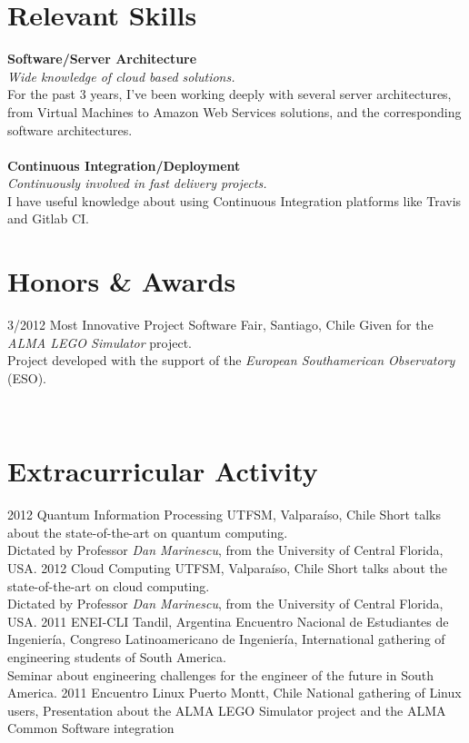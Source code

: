 \documentclass[]{friggeri-cv}
\begin{document}
\section{Relevant Skills}
\textbf{Software/Server Architecture}\\
\emph{Wide knowledge of cloud based solutions.}\\
For the past 3 years, I've been working deeply with several server architectures, from Virtual Machines to Amazon Web Services solutions, and the corresponding software architectures.\\
\\
\textbf{Continuous Integration/Deployment}\\
\emph{Continuously involved in fast delivery projects.}\\
I have useful knowledge about using Continuous Integration platforms like Travis and Gitlab CI.
\\
\section{Honors \& Awards}
\begin{entrylist}
  \entry
    {3/2012}
    {Most Innovative Project}
    {Software Fair, Santiago, Chile}
    {Given for the \emph{ALMA LEGO Simulator} project.\\
    Project developed with the support of the \emph{European Southamerican Observatory} (ESO).}
\end{entrylist}
\\
\section{Extracurricular Activity}
\begin{entrylist}
  \entry
    {2012}
    {Quantum Information Processing}
    {UTFSM, Valparaíso, Chile}
    {Short talks about the state-of-the-art on quantum computing.\\
    Dictated by Professor \emph{Dan Marinescu}, from the University of Central Florida, USA.}
  \entry
    {2012}
    {Cloud Computing}
    {UTFSM, Valparaíso, Chile}
    {Short talks about the state-of-the-art on cloud computing.\\
    Dictated by Professor \emph{Dan Marinescu}, from the University of Central Florida, USA.}
  \entry
    {2011}
    {ENEI-CLI}
    {Tandil, Argentina}
    {Encuentro Nacional de Estudiantes de Ingeniería, Congreso Latinoamericano de Ingeniería, International gathering of engineering students of South America.\\
    Seminar about engineering challenges for the engineer of the future in South America.}
  \entry
    {2011}
    {Encuentro Linux}
    {Puerto Montt, Chile}
    {National gathering of Linux users, Presentation about the ALMA LEGO Simulator project and the ALMA Common Software integration}
\end{entrylist}
\end{document}
